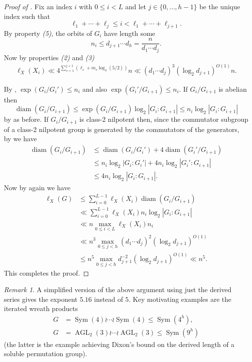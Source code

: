 \documentclass[11pt,reqno]{amsart}
\numberwithin{equation}{section}
\theoremstyle{definition}
\theoremstyle{remark}
\newtheorem{remark}[theorem]{Remark}
\newcommand\opr[1]{\operatorname{#1}}
\def\Sym{\opr{Sym}}
\def\AGL{\opr{AGL}}
\def\diam{\opr{diam}}
\def\len{\ell}
\numberwithin{equation}{section}
\begin{document}
\begin{proof}[Proof of ]
    Fix an index $i$ with $0 \le i < L$ and let $j \in \{0, \dots, h-1\}$ be the unique index such that
    \[
        \ell_1 + \cdots + \ell_j \le i < \ell_1 + \cdots + \ell_{j+1}.
    \]
    By property \emph{(5)}, the orbits of $G_i$ have length some
    \[
        n_i \le d_{j+1} \cdots d_h = \frac{n}{d_1 \cdots d_j}.
    \]
    Now by properties \emph{(2)} and \emph{(3)}
    \begin{align*}
        \len_X(X_i)
        \ll 4^{\sum_{s=1}^{j+1} (\ell_s + m_s \log_4(5/2))} n
        \ll (d_1 \cdots d_j)^3 (\log_2 d_{j+1})^{O(1)} n.
    \end{align*}

    By , $\exp(G_i / G_i') \le n_i$ and also $\exp(G_i' / G_{i+1}) \le n_i$.
    If $G_i / G_{i+1}$ is abelian then
    \[
        \diam(G_i / G_{i+1}) \le \exp(G_i / G_{i+1}) \log_2 |G_i : G_{i+1}|
        \le n_i \log_2 |G_i : G_{i+1}|
    \]
    by  as before.
    If $G_i / G_{i+1}$ is class-2 nilpotent then, since the commutator subgroup of a class-2 nilpotent group is generated by the commutators of the generators, by  we have
    \begin{align*}
        \diam(G_i / G_{i+1})
        &\le \diam(G_i / G_i') + 4 \diam(G_i' / G_{i+1}) \\
        &\le n_i \log_2 |G_i : G_i'| + 4 n_i \log_2 |G_i' : G_{i+1}| \\
        &\le 4 n_i \log_2 |G_i : G_{i+1}|.
    \end{align*}
    Now by  again we have
    \begin{align*}
        \len_X(G)
        &\le \sum_{i=0}^{L-1} \len_X(X_i) \diam(G_i / G_{i+1}) \\
        &\ll \sum_{i=0}^{L-1} \len_X(X_i) n_i \log_2 |G_i:G_{i+1}| \\
        &\ll n \max_{0 \le i < L} \len_X(X_i) n_i \\
        &\ll n^3 \max_{0 \le j < h} (d_1 \cdots d_j)^2 (\log_2 d_{j+1})^{O(1)} \\
        &\le n^5 \max_{0 \le j < h} d_{j+1}^{-2} (\log_2 d_{j+1})^{O(1)}
        \ll n^5.
    \end{align*}
    This completes the proof.
\end{proof}


\begin{remark}
    A simplified version of the above argument using just the derived series gives the exponent $5.16$ instead of $5$.
    Key motivating examples are the iterated wreath products
    \begin{align*}
        G &= \Sym(4) \wr \cdots \wr \Sym(4) \le \Sym(4^h), \\
        G &= \AGL_2(3) \wr \cdots \wr \AGL_2(3) \le \Sym(9^h)
    \end{align*}
    (the latter is the example achieving Dixon's bound on the derived length of a soluble permutation group).
\end{remark}
\end{document}
